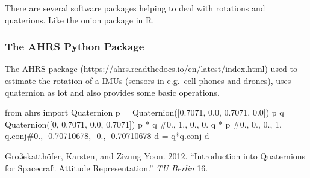 \documentclass[
  letterpaper,
  DIV=11,
  numbers=noendperiod]{scrartcl}
\newenvironment{Shaded}{\begin{snugshade}}{\end{snugshade}}
\newcommand{\CommentTok}[1]{\textcolor[rgb]{0.37,0.37,0.37}{#1}}
\newcommand{\DecValTok}[1]{\textcolor[rgb]{0.68,0.00,0.00}{#1}}
\newcommand{\FloatTok}[1]{\textcolor[rgb]{0.68,0.00,0.00}{#1}}
\newcommand{\ImportTok}[1]{\textcolor[rgb]{0.00,0.46,0.62}{#1}}
\newcommand{\NormalTok}[1]{\textcolor[rgb]{0.00,0.23,0.31}{#1}}
\newcommand{\OperatorTok}[1]{\textcolor[rgb]{0.37,0.37,0.37}{#1}}
\newlength{\cslhangindent}
\newlength{\cslentryspacingunit} %
\newenvironment{CSLReferences}[2] %
 {%
  \setlength{\parindent}{0pt}
  \ifodd #1
  \let\oldpar\par
  \def\par{\hangindent=\cslhangindent\oldpar}
  \fi
  \setlength{\parskip}{#2\cslentryspacingunit}
 }%
 {}
\begin{document}
There are several software packages helping to deal with rotations and
quaterions. Like the onion package in R.

\hypertarget{the-ahrs-python-package}{%
\subsubsection{The AHRS Python Package}\label{the-ahrs-python-package}}

The AHRS package (https://ahrs.readthedocs.io/en/latest/index.html) used
to estimate the rotation of a IMUs (sensors in e.g.~cell phones and
drones), uses quaternion as lot and also provides some basic operations.

\begin{Shaded}
\begin{Highlighting}[]
\ImportTok{from}\NormalTok{ ahrs }\ImportTok{import}\NormalTok{ Quaternion}
\NormalTok{p }\OperatorTok{=}\NormalTok{ Quaternion([}\FloatTok{0.7071}\NormalTok{, }\FloatTok{0.0}\NormalTok{, }\FloatTok{0.7071}\NormalTok{, }\FloatTok{0.0}\NormalTok{])}
\NormalTok{p }
\NormalTok{q }\OperatorTok{=}\NormalTok{ Quaternion([}\DecValTok{0}\NormalTok{, }\FloatTok{0.7071}\NormalTok{, }\FloatTok{0.0}\NormalTok{, }\FloatTok{0.7071}\NormalTok{])}
\NormalTok{p }\OperatorTok{*}\NormalTok{ q }\CommentTok{\#0., 1., 0., 0.}
\NormalTok{q }\OperatorTok{*}\NormalTok{ p }\CommentTok{\#0., 0., 0., 1.}
\NormalTok{q.conj}\CommentTok{\#0., {-}0.70710678, {-}0., {-}0.70710678}
\NormalTok{d }\OperatorTok{=}\NormalTok{ q}\OperatorTok{*}\NormalTok{q.conj }
\NormalTok{d}
\end{Highlighting}
\end{Shaded}

\hypertarget{refs}{}
\begin{CSLReferences}{1}{0}
\leavevmode{}%
Großekatthöfer, Karsten, and Zizung Yoon. 2012. {``Introduction into
Quaternions for Spacecraft Attitude Representation.''} \emph{TU Berlin}
16.

\end{CSLReferences}
\end{document}
